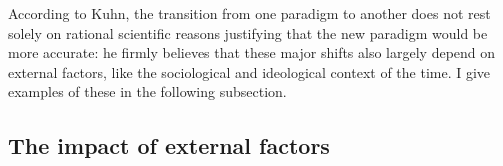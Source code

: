 According to Kuhn, the transition from one paradigm to another does not rest solely on rational scientific reasons justifying that the new paradigm would be more accurate: he firmly believes that these major shifts also largely depend on external factors, like the sociological and ideological context of the time. I give examples of these in the following subsection.




%








\subsection{The impact of external factors} 




